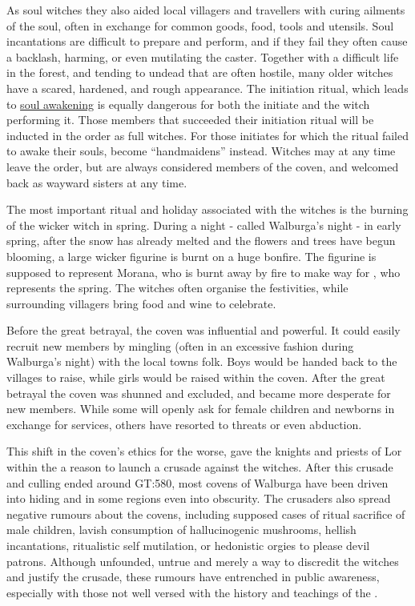 As soul witches they also aided local villagers and travellers with curing
ailments of the soul, often in exchange for common goods, food, tools and
utensils. Soul incantations are difficult to prepare and perform, and if they
fail they often cause a backlash, harming, or even mutilating the caster.
Together with a difficult life in the forest, and tending to undead that are
often hostile, many older witches have a scared, hardened, and rough
appearance. The initiation ritual, which leads to \hyperref[sec:Soul
  Awakening]{soul awakening} is equally dangerous for both the initiate and
the witch performing it. Those members that succeeded their initiation ritual
will be inducted in the order as full witches. For those initiates for which
the ritual failed to awake their souls, become ``handmaidens'' instead. Witches
may at any time leave the order, but are always considered members of the coven,
and welcomed back as wayward sisters at any time.

The most important ritual and holiday associated with the witches is the burning
of the wicker witch in spring. During a night - called Walburga's night - in
early spring, after the snow has already melted and the flowers and trees have
begun blooming, a large wicker figurine is burnt on a huge bonfire. The figurine
is supposed to represent Morana, who is burnt away by fire to make way for
, who represents the spring. The witches often organise the
festivities, while surrounding villagers bring food and wine to celebrate.

Before the great betrayal, the coven was influential and powerful. It could
easily recruit new members by mingling (often in an excessive fashion during
Walburga's night) with the local towns folk. Boys would be handed back to the
villages to raise, while girls would be raised within the coven. After the
great betrayal the coven was shunned and excluded, and became more desperate
for new members. While some will openly ask for female children and newborns
in exchange for services, others have resorted to threats or even abduction.

This shift in the coven's ethics for the worse, gave the knights and priests
of Lor within the  a reason to launch a
crusade against the witches. After this crusade and culling ended around
GT:580, most covens of Walburga have been driven into hiding and in some
regions even into obscurity. The crusaders also spread negative rumours about
the covens, including supposed cases of ritual sacrifice of male children,
lavish consumption of hallucinogenic mushrooms, hellish incantations,
ritualistic self mutilation, or hedonistic orgies to please devil patrons.
Although unfounded, untrue and merely a way to discredit the witches and
justify the crusade, these rumours have entrenched in public awareness,
especially with those not well versed with the history and teachings of the
.

